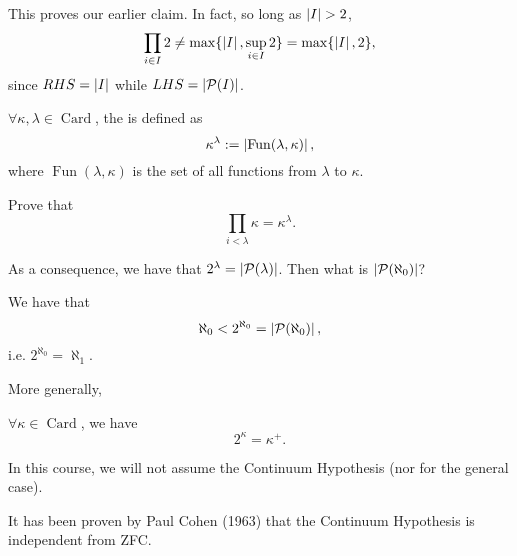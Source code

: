 \documentclass[notoc,notitlepage]{tufte-book}
\DeclareMathOperator{\Card}{Card }
\DeclareMathOperator{\Fun}{Fun }
\begin{document}
This proves our earlier claim. In fact, so long as $\left|I\right| > 2$,
\begin{equation*}
  \prod_{i \in I} 2 \neq \max \{ \left|I\right|, \sup_{i \in I} 2 \} = \max \{ \left|I\right|, 2 \},
\end{equation*}
since $RHS = \left|I\right|$ while $LHS = \left|\mathcal{P}(I)\right|$.

\begin{defn}\label{defn:cardinal_exponentiation}
  $\forall \kappa, \lambda \in \Card$, the  is defined as
  \begin{equation*}
    \kappa^\lambda := \abs{ \Fun(\lambda, \kappa) },
  \end{equation*}
  where $\Fun(\lambda, \kappa)$ is the set of all functions from $\lambda$ to $\kappa$.
\end{defn}

\begin{ex}
  Prove that
  \begin{equation*}
    \prod_{i < \lambda} \kappa = \kappa^\lambda.
  \end{equation*}
\end{ex}

As a consequence, we have that $2^\lambda = \left|\mathcal{P}(\lambda)\right|$. Then what is $\left|\mathcal{P}(\aleph_0)\right|$?

\begin{axiom}\label{axiom:continuum_hypothesis}
  We have that
  \begin{equation*}
    \aleph_0 < 2^{\aleph_0} = \left|\mathcal{P}(\aleph_0)\right|,
  \end{equation*}
  i.e. $2^{\aleph_0} = \aleph_1$.
\end{axiom}

More generally,

\begin{axiom}\label{axiom:generalized_continuum_hypothesis}
  $\forall \kappa \in \Card$, we have
  \begin{equation*}
    2^\kappa = \kappa^+.
  \end{equation*}
\end{axiom}

In this course, we will not assume the Continuum Hypothesis (nor for the general case).

It has been proven by Paul Cohen (1963)\cite{cohen1963} that the Continuum Hypothesis is independent from ZFC.
\end{document}
